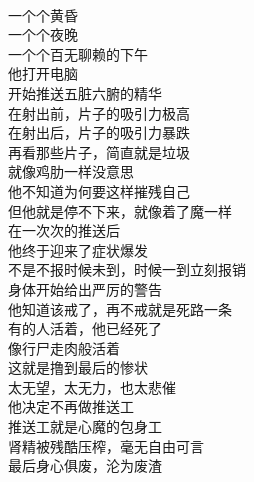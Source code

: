 \begin{poem}[推送工]
    \begin{multicols}{2}
        \centering~\\
        一个个黄昏 \\ 一个个夜晚 \\ 一个个百无聊赖的下午 \\ 他打开电脑 \\ 开始推送五脏六腑的精华 \\ 在射出前，片子的吸引力极高 \\ 在射出后，片子的吸引力暴跌 \\ 再看那些片子，简直就是垃圾 \\ 就像鸡肋一样没意思 \\ 他不知道为何要这样摧残自己 \\ 但他就是停不下来，就像着了魔一样 \\ 在一次次的推送后 \\ 他终于迎来了症状爆发 \\ 不是不报时候未到，时候一到立刻报销 \\ 身体开始给出严厉的警告 \\ 他知道该戒了，再不戒就是死路一条 \\ 有的人活着，他已经死了 \\ 像行尸走肉般活着 \\ 这就是撸到最后的惨状 \\ 太无望，太无力，也太悲催 \\ 他决定不再做推送工 \\ 推送工就是心魔的包身工 \\ 肾精被残酷压榨，毫无自由可言 \\ 最后身心俱废，沦为废渣
    \end{multicols}
\end{poem}


